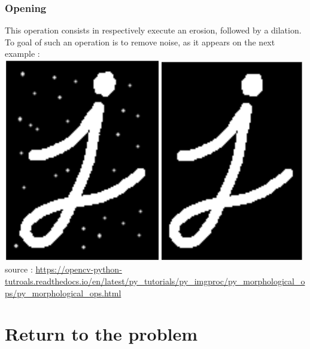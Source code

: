 \documentclass{article}
\begin{document}
\subsubsection{Opening}

This operation consists in respectively execute an erosion, followed by a dilation. To goal of such an operation is to remove noise, as it appears on the next example :\\

\includegraphics[width=6.8cm]{images/img15.png} 
\includegraphics[width=6.3cm]{images/img16.png}\\
source : \url{https://opencv-python-tutroals.readthedocs.io/en/latest/py_tutorials/py_imgproc/py_morphological_ops/py_morphological_ops.html}\\


\section{Return to the problem}
\end{document}
